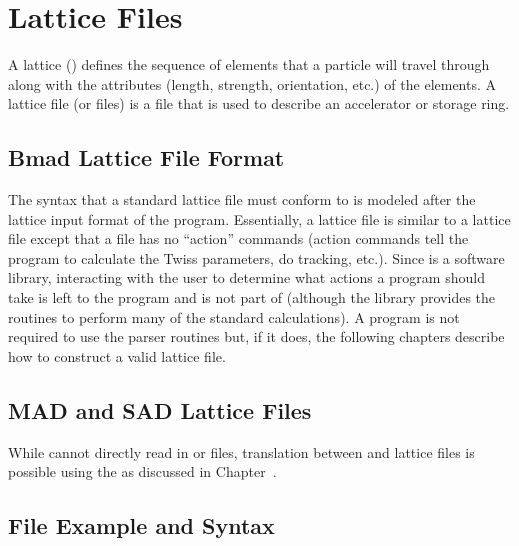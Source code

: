 \chapter{Lattice Files}
\label{c:lat.file}

A lattice () defines the sequence of elements that a particle will travel
through along with the attributes (length, strength, orientation, etc.) of the elements.  A lattice
file (or files) is a file that is used to describe an accelerator or storage ring.

\section{Bmad Lattice File Format}
\label{s:lattice.file.formats}

The syntax that a \bmad standard lattice file must conform to is modeled after the lattice input
format of the \mad program.  Essentially, a \bmad lattice file is similar to a \mad lattice file
except that a \bmad file has no ``action'' commands (action commands tell the program to calculate
the Twiss parameters, do tracking, etc.).  Since \bmad is a software library, interacting with the
user to determine what actions a program should take is left to the program and is not part of \bmad
(although the \bmad library provides the routines to perform many of the standard calculations). A
program is not required to use the \bmad parser routines but, if it does, the following chapters
describe how to construct a valid lattice file.

\section{MAD and SAD Lattice Files}
\label{s:mad.sad}

While \bmad cannot directly read in \mad\cite{b:maduser} or \cite{b:sad} files, translation
between \mad and \bmad lattice files is possible using the  as
discussed in Chapter~.

\newpage

\section{File Example and Syntax}

